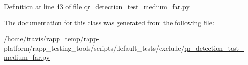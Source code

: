 Definition at line 43 of file qr\-\_\-detection\-\_\-test\-\_\-medium\-\_\-far.\-py.



The documentation for this class was generated from the following file\-:\begin{DoxyCompactItemize}
\item 
/home/travis/rapp\-\_\-temp/rapp-\/platform/rapp\-\_\-testing\-\_\-tools/scripts/default\-\_\-tests/exclude/\hyperlink{qr__detection__test__medium__far_8py}{qr\-\_\-detection\-\_\-test\-\_\-medium\-\_\-far.\-py}\end{DoxyCompactItemize}
